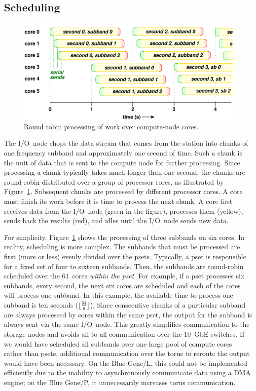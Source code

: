 \documentclass{sig-alternate}
\begin{document}
\subsection{Scheduling}

\begin{figure}[ht]
\includegraphics[width=\columnwidth]{round-robin.pdf}
\caption{Round robin processing of work over compute-node cores.}
\label{fig:round-robin}
\end{figure}

The I/O~node chops the data stream that comes from the station into chunks of
one frequency subband and approximately one second of time.
Such a chunk is the unit of data that is sent to the compute node for further
processing.
Since processing a chunk typically takes much longer than one second,
the chunks are round-robin distributed over a group of processor cores,
as illustrated by Figure~\ref{fig:round-robin}.
Subsequent chunks are processed by different processor cores.
A core must finish its work before it is time to process the next chunk.
A core first receives data from the I/O~node (green in the figure),
processes them (yellow), sends back the results (red), and idles until the
I/O~node sends new data.

For simplicity, Figure~\ref{fig:round-robin} shows the processing of
three subbands on six cores.
In reality, scheduling is more complex.
The subbands that must be processed are first (more or less) evenly divided
over the psets.
Typically, a pset is responsible for a fixed set of four to sixteen subbands.
Then, the subbands are round-robin scheduled over the 64~cores \emph{within the
pset}.
For example, if a pset processes six subbands, every second, the next six
cores are scheduled and each of the cores will process one subband.
In this example, the available time to process one subband is ten seconds
($\lfloor\frac{64}{6}\rfloor$).
Since consecutive chunks of a particular subband are always processed by cores
within the same pset, the output for the subband is always sent via the same
I/O~node.
This greatly simplifies communication to the storage nodes and avoids
all-to-all communication over the 10~GbE switches.
If we would have scheduled all subbands over one large pool of compute cores
rather than psets, additional communication over the torus to reroute the
output would have been necessary.
On the Blue Gene/L, this could not be implemented efficiently due to the
inability to asynchronously communicate data using a DMA engine; on the
Blue Gene/P, it unnecessarily increases torus communication.
\end{document}
